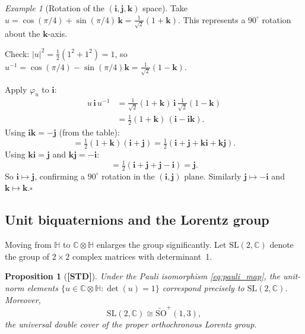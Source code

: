 \documentclass[12pt,a4paper]{article}
\newtheorem{proposition}[theorem]{Proposition}
\theoremstyle{definition}
\theoremstyle{remark}
\newtheorem{example}[theorem]{Example}
\begin{document}
\begin{example}[Rotation of the $(\mathbf{i},\mathbf{j},\mathbf{k})$ space]
  \label{ex:rotation}
  Take $u = \cos(\pi/4) + \sin(\pi/4)\,\mathbf{k}
          = \tfrac{1}{\sqrt{2}}(1 + \mathbf{k})$.
  This represents a $90^{\circ}$ rotation about the $\mathbf{k}$-axis.

  Check: $|u|^2 = \tfrac{1}{2}(1^2+1^2) = 1$, so $u^{-1}
  = \cos(\pi/4) - \sin(\pi/4)\mathbf{k}
  = \tfrac{1}{\sqrt{2}}(1-\mathbf{k})$.

  Apply $\varphi_u$ to $\mathbf{i}$:
  \begin{align*}
    u\,\mathbf{i}\,u^{-1}
    &= \tfrac{1}{\sqrt{2}}(1+\mathbf{k})\,\mathbf{i}\,
       \tfrac{1}{\sqrt{2}}(1-\mathbf{k}) \\
    &= \tfrac{1}{2}(1+\mathbf{k})\,(\mathbf{i} - \mathbf{i}\mathbf{k}).
  \end{align*}
  Using $\mathbf{i}\mathbf{k} = -\mathbf{j}$ (from the table):
  \[
    = \tfrac{1}{2}(1+\mathbf{k})(\mathbf{i}+\mathbf{j})
    = \tfrac{1}{2}(\mathbf{i}+\mathbf{j}+\mathbf{k}\mathbf{i}+\mathbf{k}\mathbf{j}).
  \]
  Using $\mathbf{k}\mathbf{i}=\mathbf{j}$ and $\mathbf{k}\mathbf{j}=-\mathbf{i}$:
  \[
    = \tfrac{1}{2}(\mathbf{i}+\mathbf{j}+\mathbf{j}-\mathbf{i})
    = \mathbf{j}.
  \]
  So $\mathbf{i}\mapsto\mathbf{j}$, confirming a $90^{\circ}$ rotation in the
  $(\mathbf{i},\mathbf{j})$ plane.  Similarly $\mathbf{j}\mapsto-\mathbf{i}$
  and $\mathbf{k}\mapsto\mathbf{k}$.\hfill$\square$
\end{example}

\subsection{Unit biquaternions and the Lorentz group}

Moving from $\mathbb{H}$ to $\mathbb{C}\otimes\mathbb{H}$ enlarges the group
significantly.  Let $\mathrm{SL}(2,\mathbb{C})$ denote the group of $2\times2$
complex matrices with determinant~1.

\begin{proposition}[\textbf{[STD]}]
  \label{prop:sl2c}
  Under the Pauli isomorphism \eqref{eq:pauli_map}, the unit-norm elements
  $\{u\in\mathbb{C}\otimes\mathbb{H} : \det(u)=1\}$ correspond precisely
  to $\mathrm{SL}(2,\mathbb{C})$.  Moreover,
  \[
    \mathrm{SL}(2,\mathbb{C}) \cong \widetilde{\mathrm{SO}}^+(1,3),
  \]
  the universal double cover of the proper orthochronous Lorentz group.
\end{proposition}
\end{document}
